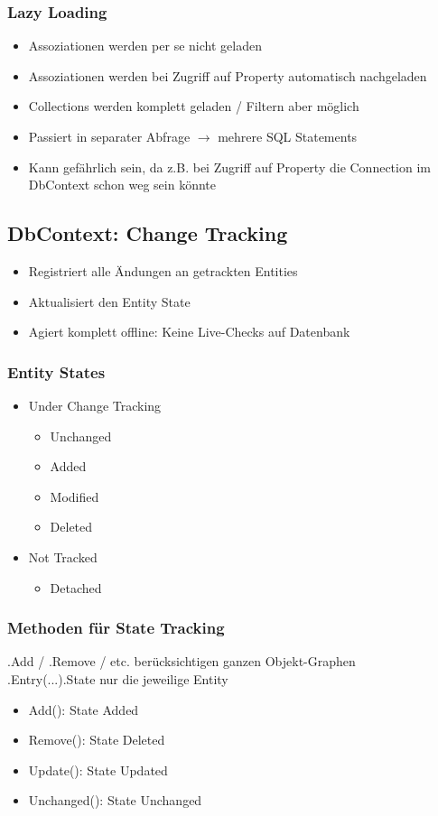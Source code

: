 \begin{multicols*}{2}
\subsubsection{Lazy Loading}
\begin{itemize}
    \item Assoziationen werden per se nicht geladen
    \item Assoziationen werden bei Zugriff auf Property automatisch nachgeladen
    \item Collections werden komplett geladen / Filtern aber möglich
    \item Passiert in separater Abfrage $\rightarrow$ mehrere SQL Statements 
    \item Kann gefährlich sein, da z.B. bei Zugriff auf Property die Connection im DbContext schon weg sein könnte
\end{itemize}

\subsection{DbContext: Change Tracking}
\begin{itemize}
    \item Registriert alle Ändungen an getrackten Entities
    \item Aktualisiert den Entity State
    \item Agiert komplett offline: Keine Live-Checks auf Datenbank
\end{itemize}
\subsubsection{Entity States}
\begin{itemize}
    \item Under Change Tracking
    \begin{itemize}
        \item Unchanged
        \item Added
        \item Modified
        \item Deleted
    \end{itemize}
    \item Not Tracked
    \begin{itemize}
        \item Detached
    \end{itemize}
\end{itemize}
\subsubsection{Methoden für State Tracking}
.Add / .Remove / etc. berücksichtigen ganzen Objekt-Graphen\\
.Entry(...).State nur die jeweilige Entity
\begin{itemize}
    \item Add(): State Added
    \item Remove(): State Deleted
    \item Update(): State Updated
    \item Unchanged(): State Unchanged
\end{itemize}

\end{multicols*}
